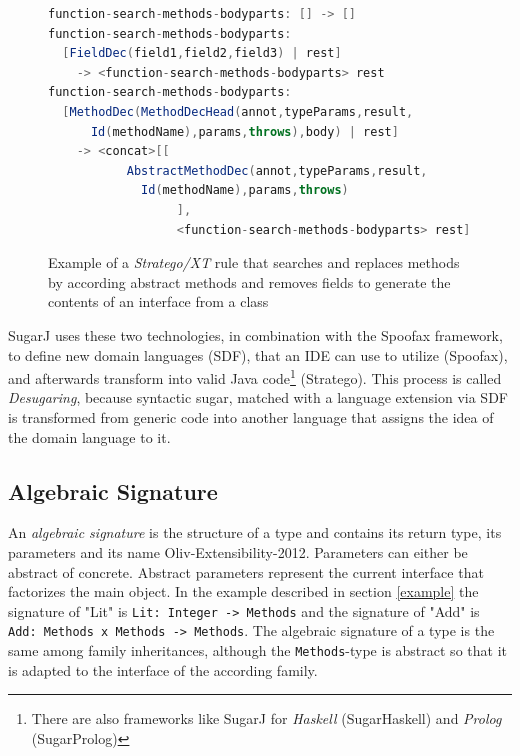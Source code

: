 \documentclass{report}
\begin{document}
\begin{figure}[H]
\begin{lstlisting}[language=java,breaklines=false,morekeywords={field1,field2,field3,annot,typeParams,result,methodName,params,throws,body,rest},keywordstyle=\bfseries\color{OliveGreen}]
function-search-methods-bodyparts: [] -> []
function-search-methods-bodyparts:
  [FieldDec(field1,field2,field3) | rest]
    -> <function-search-methods-bodyparts> rest
function-search-methods-bodyparts:
  [MethodDec(MethodDecHead(annot,typeParams,result,
      Id(methodName),params,throws),body) | rest]
    -> <concat>[[
		   AbstractMethodDec(annot,typeParams,result,
		     Id(methodName),params,throws)
		          ],
		          <function-search-methods-bodyparts> rest]
\end{lstlisting}
\caption{Example of a \emph{Stratego/XT} rule that searches and replaces methods by according abstract methods and removes fields to generate the contents of an interface from a class}
\label{exampleStrategoClassInterfaceTranslation}
\end{figure}


SugarJ uses these two technologies, in combination with the Spoofax framework, to define new domain languages (SDF), that an IDE can use to utilize (Spoofax), and afterwards transform into valid Java code\footnote{There are also frameworks like SugarJ for \emph{Haskell} (SugarHaskell) and \emph{Prolog} (SugarProlog)} (Stratego). This process is called \emph{Desugaring}, because syntactic sugar, matched with a language extension via SDF is transformed from generic code into another language that assigns the idea of the domain language to it.


\subsection{Algebraic Signature}

\label{albegraicSignature}

An \emph{algebraic signature} is the structure of a type and contains its return type, its parameters and its name {Oliv-Extensibility-2012}. Parameters can either be abstract of concrete. Abstract parameters represent the current interface that factorizes the main object. In the example described in section \ref{example} the signature of "Lit" is \lstinline{Lit: Integer -> Methods} and the signature of "Add" is \lstinline{Add: Methods x Methods -> Methods}. The algebraic signature of a type is the same among family inheritances, although the \lstinline{Methods}-type is abstract so that it is adapted to the interface of the according family.
\end{document}
